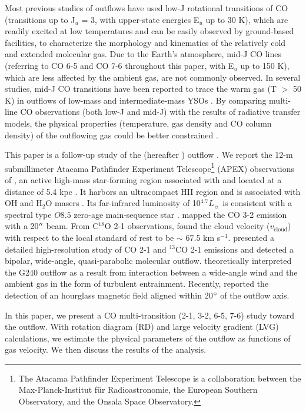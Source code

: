 Most previous studies of outflows have used low-J rotational transitions of CO (transitions up to J$_u$ = 3, with upper-state energies E$_u$ up to 30 K), which are readily excited at low temperatures and can be easily observed by ground-based facilities, to characterize the morphology and kinematics of the relatively cold and extended molecular gas. Due to the Earth's atmosphere, mid-J CO lines (referring to CO 6-5 and CO 7-6 throughout this paper, with  E$_u$ up to 150 K), which are less affected by the ambient gas, are not commonly observed. In several studies, mid-J CO transitions have been reported to trace the warm gas (T $>$ 50 K) in outflows of low-mass and intermediate-mass YSOs \citep{2009A&A...501..633V, 2009A&A...507.1425V, 2012A&A...542A..86Y, 2016A&A...587A..17V}. By comparing multi-line CO observations (both low-J and mid-J) with the results of radiative transfer models, the physical properties (temperature, gas density and CO column density) of the outflowing gas could be better constrained \citep{2015A&A...581A...4L}. 

This paper is a follow-up study of the  (hereafter ) outflow \citep{2009ApJ...696...66Q}. We report the 12-m submillimeter Atacama Pathfinder Experiment Telescope\footnote{    The Atacama Pathfinder Experiment Telescope is a collaboration between the Max-Planck-Institut f{\"u}r Radioastronomie, the European Southern Observatory, and the Onsala Space Observatory.} (APEX) observations of , an active high-mass star-forming region associated with  and located at a distance of 5.4 kpc \citep{2014ApJ...790...99C, 2015PASJ...67...69S}. It harbors an ultracompact H{\scriptsize II} region and is associated with OH and H$_2$O masers \citep{1993AJ....105.1495H, 1997MNRAS.289..203C, 1998AJ....116.1897M, 1999ApJS..123..487M, 2003MNRAS.341..551C}. Its far-infrared luminosity of 10$^{4.7} L_\sun$ is consistent with a spectral type $O8.5$ zero-age main-sequence star \citep{1998AJ....116.1897M}. \citet{2003A&A...412..175K} mapped the CO 3-2 emission with a 20${\mbox{$^{\prime\prime}$}}$ beam. From C$^{18}$O 2-1 observations, \citet{2003A&A...412..175K} found the cloud velocity ($v_{\mathrm{cloud}}$) with respect to the local standard of rest to be $\sim$ 67.5 km s$^{-1}$. \citet{2009ApJ...696...66Q} presented a detailed high-resolution study of CO 2-1 and $^{13}$CO 2-1 emissions and detected a bipolar, wide-angle, quasi-parabolic molecular outflow. \citet{2013A&A...559A..23L} theoretically interpreted the G240 outflow as a result from interaction between a wide-angle wind and the ambient gas in the form of turbulent entrainment. Recently, \citet{2014ApJ...794L..18Q} reported the detection of an hourglass magnetic field aligned within 20${\mbox{$^\circ$}}$ of the outflow axis.

In this paper, we present a CO multi-transition (2-1, 3-2, 6-5, 7-6) study toward the  outflow. With rotation diagram (RD) and large velocity gradient (LVG) calculations, we estimate the physical parameters of the outflow as functions of gas velocity. We then discuss the results of the analysis.



